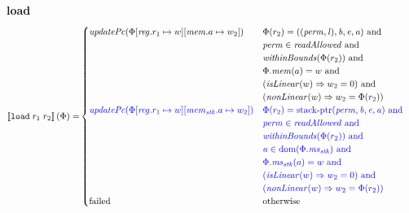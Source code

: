 \documentclass[a4paper]{article}
\newcommand{\sem}[1]{\left\llbracket #1 \right\rrbracket}
\newcommand{\dom}{\mathrm{dom}}
\newcommand{\tand}{\text{ and }}
\newcommand{\totherwise}{\text{otherwise }}
\newcommand{\sourcecolor}[1]{\color{blue}}
\newcommand{\src}[1]{{\sourcecolor{} #1}}
\newcommand{\targetcolor}[1]{\color{black}}
\newcommand{\trg}[1]{{\targetcolor{} #1}}
\newcommand{\zinstr}[1]{\texttt{#1}}
\newcommand{\twoinstr}[3]{
  \ifthenelse{\equal{#2#3}{}}
  {\zinstr{#1}}
  {\zinstr{#1} \; #2 \; #3}
}
\newcommand{\tload}[2]{\twoinstr{\trg{load}}{#1}{#2}}
\newcommand{\update}[2]{[#1 \mapsto #2]}
\newcommand{\updReg}[2]{\update{\reg.#1}{#2}}
\newcommand{\perm}{\var{perm}}
\newcommand{\lin}{\var{l}}
\newcommand{\stkptr}[1]{\mathrm{stack\text{-}ptr}(#1)}
\newcommand{\failed}{\mathrm{failed}}
\newcommand{\var}[1]{\mathit{#1}}
\newcommand{\reg}{\var{reg}}
\newcommand{\mem}{\var{mem}}
\newcommand{\ms}{\var{ms}}
\newcommand{\stk}{\var{stk}}
\newcommand{\baddr}{\var{b}}
\newcommand{\eaddr}{\var{e}}
\newcommand{\aaddr}{\var{a}}
\newcommand{\plainfun}[2]{
  \ifthenelse{\equal{#2}{}}
  {\mathit{#1}}
  {\mathit{#1}(#2)}
}
\newcommand{\updPcAddr}[1]{\plainfun{updatePc}{#1}}
\newcommand{\readAllowed}[1]{\plainfun{readAllowed}{#1}}
\newcommand{\nonLinear}[1]{\plainfun{nonLinear}{#1}}
\newcommand{\isLinear}[1]{\plainfun{isLinear}{#1}}
\newcommand{\withinBounds}[1]{\plainfun{withinBounds}{#1}}
\begin{document}
\noindent\textbf{load}\\
\begin{align*}
  \sem{\tload{r_1}{r_2}}(\Phi) = & 
                                  \begin{cases}
                                    \updPcAddr{\Phi\updReg{r_1}{w}\update{\mem.a}{w_2}} & 
                                    \arraycolsep=0pt
                                    \begin{array}[t]{l}
                                      \Phi(r_2) = ((\perm,\lin),\baddr,\eaddr,\aaddr) \tand \\
                                      \perm \in \readAllowed{} \tand\\
                                      \withinBounds{\Phi(r_2)} \tand \\
                                      \Phi.\mem(a) = w \tand \\
                                      (\isLinear{w} \Rightarrow w_2 = 0) \tand \\
                                      (\nonLinear{w} \Rightarrow w_2 = \Phi(r_2))
                                    \end{array}
                                    \\
                                    \src{\updPcAddr{\Phi\updReg{r_1}{w}\update{\mem_\stk.a}{w_2}}} & 
                                    \arraycolsep=0pt
                                    \begin{array}[t]{l}
                                      \src{\Phi(r_2) = \stkptr{\perm,\baddr,\eaddr,\aaddr} \tand} \\
                                      \src{\perm \in \readAllowed{} \tand} \\
                                      \src{\withinBounds{\Phi(r_2)} \tand} \\
                                      \src{\aaddr \in \dom(\Phi.\ms_\stk) \tand} \\
                                      \src{\Phi.\ms_\stk(a) = w \tand} \\
                                      \src{(\isLinear{w} \Rightarrow w_2 = 0) \tand} \\
                                      \src{(\nonLinear{w} \Rightarrow w_2 = \Phi(r_2))}
                                    \end{array}
                                    \\
                                    \failed & \totherwise                                    
                                  \end{cases}
\end{align*} 
\end{document}
